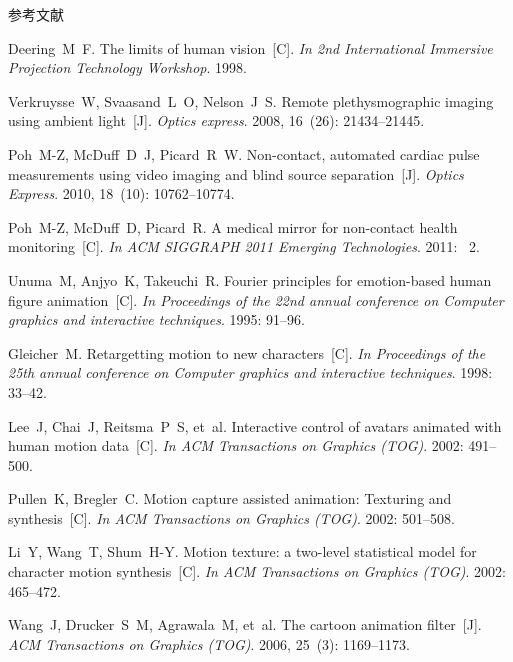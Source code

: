 \documentclass[xcolor=svgnames,serif,table]{beamer}
\begin{document}
\begin{frame}[allowframebreaks]{参考文献}
\tiny
\sffamily
\begin{thebibliography}{10}

Deering~M~F.
\newblock The limits of human vision~[C].
\newblock \emph{In 2nd International Immersive Projection Technology Workshop}.
1998.

Verkruysse~W, Svaasand~L~O, Nelson~J~S.
\newblock Remote plethysmographic imaging using ambient light~[J].
\newblock \emph{Optics express}.
2008, 16~(26):  21434--21445.

Poh~M-Z, McDuff~D~J, Picard~R~W.
\newblock Non-contact, automated cardiac pulse measurements using video imaging and blind source separation~[J].
\newblock \emph{Optics Express}. 2010, 18~(10):  10762--10774.

Poh~M-Z, McDuff~D, Picard~R.
\newblock A medical mirror for non-contact health monitoring~[C].
\newblock \emph{In ACM SIGGRAPH 2011 Emerging Technologies}. 2011: ~2.

Unuma~M, Anjyo~K, Takeuchi~R.
\newblock Fourier principles for emotion-based human figure animation~[C].
\newblock \emph{In Proceedings of the 22nd annual conference on Computer graphics and
  interactive techniques}.
1995:  91--96.

Gleicher~M.
\newblock Retargetting motion to new characters~[C].
\newblock \emph{In Proceedings of the 25th annual conference on Computer graphics and
  interactive techniques}.
1998:  33--42.

Lee~J, Chai~J, Reitsma~P~S, et~al.
\newblock Interactive control of avatars animated with human motion data~[C].
\newblock \emph{In ACM Transactions on Graphics (TOG)}.
2002:  491--500.

Pullen~K, Bregler~C.
\newblock Motion capture assisted animation: Texturing and synthesis~[C].
\newblock \emph{In ACM Transactions on Graphics (TOG)}.
2002:  501--508.

Li~Y, Wang~T, Shum~H-Y.
\newblock Motion texture: a two-level statistical model for character motion
  synthesis~[C].
\newblock \emph{In ACM Transactions on Graphics (TOG)}.
2002:  465--472.

Wang~J, Drucker~S~M, Agrawala~M, et~al.
\newblock The cartoon animation filter~[J].
\newblock \emph{ACM Transactions on Graphics (TOG)}.
2006, 25~(3):  1169--1173.


\end{thebibliography}
\end{frame}
\end{document}

